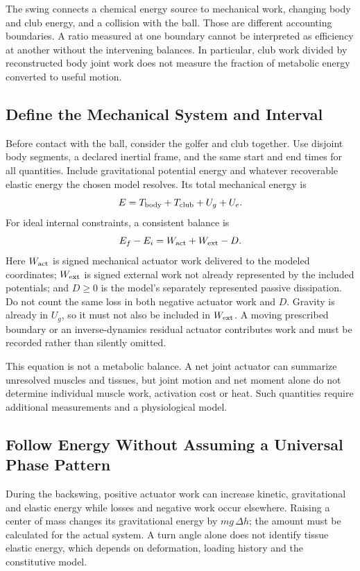 The swing connects a chemical energy source to mechanical work, changing body and club energy, and a collision with the ball. Those are different accounting boundaries. A ratio measured at one boundary cannot be interpreted as efficiency at another without the intervening balances. In particular, club work divided by reconstructed body joint work does not measure the fraction of metabolic energy converted to useful motion.

\subsection*{Define the Mechanical System and Interval}

Before contact with the ball, consider the golfer and club together. Use disjoint body segments, a declared inertial frame, and the same start and end times for all quantities. Include gravitational potential energy and whatever recoverable elastic energy the chosen model resolves. Its total mechanical energy is
\[
E=T_{\rm body}+T_{\rm club}+U_g+U_e.
\]
For ideal internal constraints, a consistent balance is
\[
E_f-E_i=W_{\rm act}+W_{\rm ext}-D.
\]
Here $W_{\rm act}$ is signed mechanical actuator work delivered to the modeled coordinates; $W_{\rm ext}$ is signed external work not already represented by the included potentials; and $D\geq0$ is the model's separately represented passive dissipation. Do not count the same loss in both negative actuator work and $D$. Gravity is already in $U_g$, so it must not also be included in $W_{\rm ext}$. A moving prescribed boundary or an inverse-dynamics residual actuator contributes work and must be recorded rather than silently omitted.

This equation is not a metabolic balance. A net joint actuator can summarize unresolved muscles and tissues, but joint motion and net moment alone do not determine individual muscle work, activation cost or heat. Such quantities require additional measurements and a physiological model.

\subsection*{Follow Energy Without Assuming a Universal Phase Pattern}

During the backswing, positive actuator work can increase kinetic, gravitational and elastic energy while losses and negative work occur elsewhere. Raising a center of mass changes its gravitational energy by $mg\,\Delta h$; the amount must be calculated for the actual system. A turn angle alone does not identify tissue elastic energy, which depends on deformation, loading history and the constitutive model.


